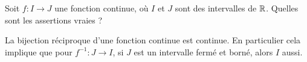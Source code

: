 \begin{question}
Soit $f : I \to J$ une fonction continue, où $I$ et $J$ sont des intervalles de $\mathbb{R}$. Quelles sont les assertions vraies ?
\begin{answers}



\end{answers}
\begin{explanations}
La bijection réciproque d'une fonction continue est continue. En particulier cela implique que pour $f^{-1} : J \to I$, si $J$ est un intervalle fermé et borné, alors $I$ aussi.
\end{explanations}
\end{question}

